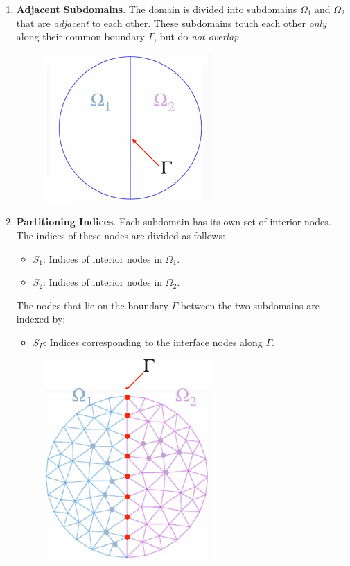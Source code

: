 \begin{enumerate}
    \item \textbf{Adjacent Subdomains}. The domain is divided into subdomains $\Omega_{1}$ and $\Omega_{2}$ that are \emph{adjacent} to each other. These subdomains touch each other \emph{only} along their common boundary $\Gamma$, but do \emph{not overlap}.
    \begin{figure}[!htp]
        \centering
        \includegraphics[width=.3\textwidth]{img/non-overlapping-subdomains-1.pdf}
    \end{figure}
    
    \item \textbf{Partitioning Indices}. Each subdomain has its own set of interior nodes. The indices of these nodes are divided as follows:
    \begin{itemize}
        \item $S_{1}$: Indices of interior nodes in $\Omega_{1}$.
        \item $S_{2}$: Indices of interior nodes in $\Omega_{2}$.
    \end{itemize}
    The nodes that lie on the boundary $\Gamma$ between the two subdomains are indexed by:
    \begin{itemize}
        \item $S_{\Gamma}$: Indices corresponding to the interface nodes along $\Gamma$.
    \end{itemize}
    \begin{figure}[!htp]
        \centering
        \includegraphics[width=.3\textwidth]{img/non-overlapping-subdomains-2.pdf}
    \end{figure}


\end{enumerate}
